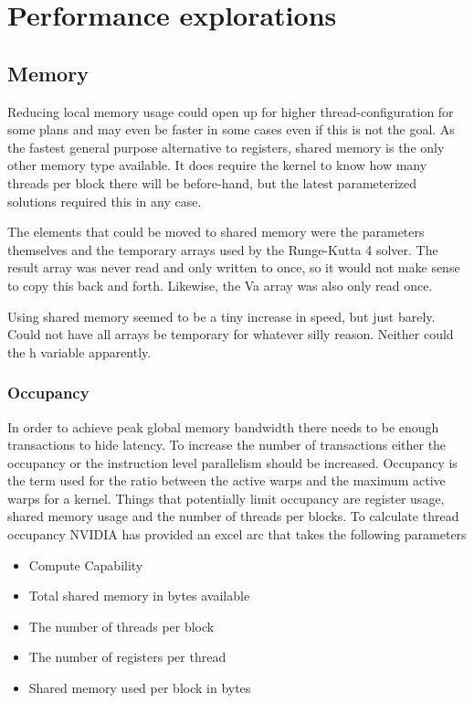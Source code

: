 \section{Performance explorations}
\subsection{Memory}
Reducing local memory usage could open up for higher thread-configuration for some plans and may even be faster in some cases even if this is not the goal.
As the fastest general purpose alternative to registers, shared memory is the only other memory type available.
It does require the kernel to know how many threads per block there will be before-hand, but the latest parameterized solutions required this in any case.

The elements that could be moved to shared memory were the parameters themselves and the temporary arrays used by the Runge-Kutta 4 solver.
The result array was never read and only written to once, so it would not make sense to copy this back and forth.
Likewise, the Va array was also only read once.

Using shared memory seemed to be a tiny increase in speed, but just barely.
Could not have all arrays be temporary for whatever silly reason.
Neither could the h variable apparently.

\subsubsection{Occupancy}
In order to achieve peak global memory bandwidth there needs to be enough transactions to hide latency.
To increase the number of transactions either the occupancy or the instruction level parallelism should be increased.
Occupancy is the term used for the ratio between the active warps and the maximum active warps for a kernel.
Things that potentially limit occupancy are register usage, shared memory usage and the number of threads per blocks.
To calculate thread occupancy NVIDIA has provided an excel arc that takes the following parameters
\begin{itemize}
\item Compute Capability
\item Total shared memory in bytes available
\item The number of threads per block
\item The number of registers per thread
\item Shared memory used per block in bytes
\end{itemize}

